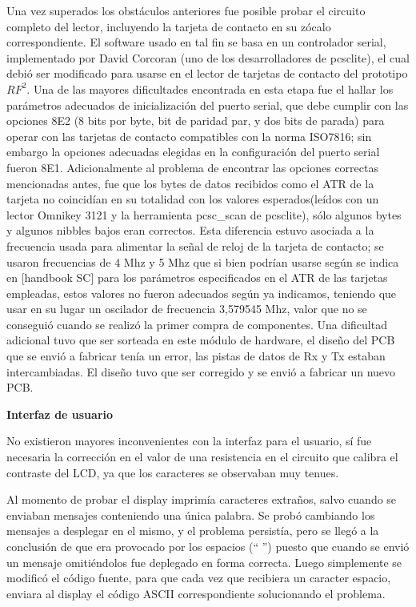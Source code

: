 Una vez superados los obstáculos anteriores fue posible probar el circuito completo del lector, incluyendo 
la tarjeta de contacto en su zócalo correspondiente. El software usado en tal fin se basa en un controlador
serial, implementado por David Corcoran (uno de los desarrolladores de pcsclite), el cual debió ser modificado para usarse en el lector de tarjetas de contacto del prototipo ${RF^{2}}$. Una de las mayores dificultades encontrada en esta etapa fue el hallar los parámetros adecuados de inicialización del puerto serial, que debe cumplir con las opciones 8E2 (8 bits por byte, bit de paridad par, y dos bits de parada) para operar con las tarjetas de contacto compatibles
con la norma ISO7816; sin embargo la opciones adecuadas elegidas en la configuración del puerto serial fueron 8E1.
Adicionalmente al problema de encontrar las opciones correctas mencionadas antes, fue que los bytes de datos
recibidos como el ATR de la tarjeta no coincidían en su totalidad con los valores esperados(leídos con un lector
Omnikey 3121 y la herramienta pcsc\_scan de pcsclite), sólo algunos bytes y algunos nibbles bajos eran correctos.
Esta diferencia estuvo asociada a la frecuencia usada para alimentar la señal de reloj de la tarjeta de contacto;
se usaron frecuencias de 4 Mhz y 5 Mhz que si bien podrían usarse según se indica en [handbook SC] para
los parámetros especificados en el ATR de las tarjetas empleadas, estos valores no fueron adecuados según ya indicamos,
teniendo que usar en su lugar un oscilador de frecuencia 3,579545 Mhz, valor que no se conseguió cuando se realizó
la primer compra de componentes.
Una dificultad adicional tuvo que ser sorteada en este módulo de hardware, el diseño del PCB que se envió a fabricar
tenía un error, las pistas de datos de Rx y Tx estaban intercambiadas. El diseño tuvo que ser corregido y se 
envió a fabricar un nuevo PCB.


\bigskip
\bigskip
{\bf{Interfaz de usuario}}


No existieron mayores inconvenientes con la interfaz para el usuario, sí fue 
necesaria la corrección en el valor de una resistencia en el circuito que calibra 
el contraste del LCD, ya que los caracteres se observaban muy tenues.

\bigskip
\bigskip
Al momento de probar el display imprimía caracteres extraños, salvo cuando se enviaban mensajes conteniendo una única palabra. Se probó cambiando los mensajes a desplegar en el mismo, y el problema persistía, pero se llegó a la conclusión de que era provocado por los espacios (“ ”) puesto que cuando se envió un mensaje omitiéndolos fue deplegado en forma correcta. Luego simplemente se 
modificó el código fuente, para que cada vez que recibiera un caracter espacio, enviara al display el código ASCII correspondiente solucionando el problema.

